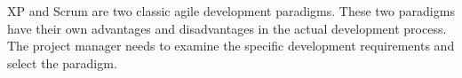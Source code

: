 \documentclass{sigchi}
\begin{document}
XP and Scrum are two classic agile development paradigms. These two paradigms have their own advantages and disadvantages in the actual development process. The project manager needs to examine the specific development requirements and select the paradigm.



\end{document}

